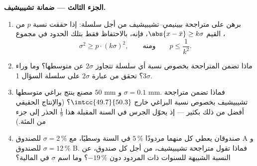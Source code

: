 \begin{problem}
\medskip
\noindent\textbf{الجزء الثالث --- ضمانة تشيبيشيف.}
\begin{enumerate}[resume]
  \item برهن على متراجحة بيينيمي--تشيبيشيف من أجل
        سلسلة: إذا حققت نسبة $p$ من القيم
        $\abs{x - \bar x} \geq k\sigma$، فإنه، بالاحتفاظ فقط
        بتلك الحدود في مجموع ،
        \[
        \sigma^2 \geq p \cdot (k\sigma)^2,
        \qquad\text{ومنه}\qquad
        p \leq \frac{1}{k^2} .
        \]
  \item ماذا تضمن المتراجحة بخصوص نسبة
        أي سلسلة تتجاوز $2\sigma$ عن متوسطها؟ وما وراء
        $3\sigma$؟ تحقق من عبارة $2\sigma$ على سلسلة
        السؤال 1.
  \item مصنع ينتج براغي متوسطها $50$ mm و
        $\sigma = 0.1$ mm. فماذا تضمن متراجحة تشيبيشيف بخصوص
        نسبة البراغي خارج
        $\intcc{49.7}{50.3}$؟ (والإنتاج الحقيقي أفضل من ذلك بكثير
        --- إذ يحوّل  الجرس في السنة المقبلة هذا
        $\frac19$ الحذر إلى جزء من المئة.)
  \item صندوقان يعطي كل منهما مردودًا $5\,\%$ في السنة وسطيًا، مع
        $\sigma = 2\,\%$ للصندوق A و $\sigma = 12\,\%$ للصندوق
        B. فماذا تقول متراجحة تشيبيشيف، من أجل كل صندوق، عن
        النسبة الشبيهة  للسنوات ذات المردود
        دون $-19\,\%$؟ وما اسم $\sigma$ في المالية؟
\end{enumerate}


\end{problem}
